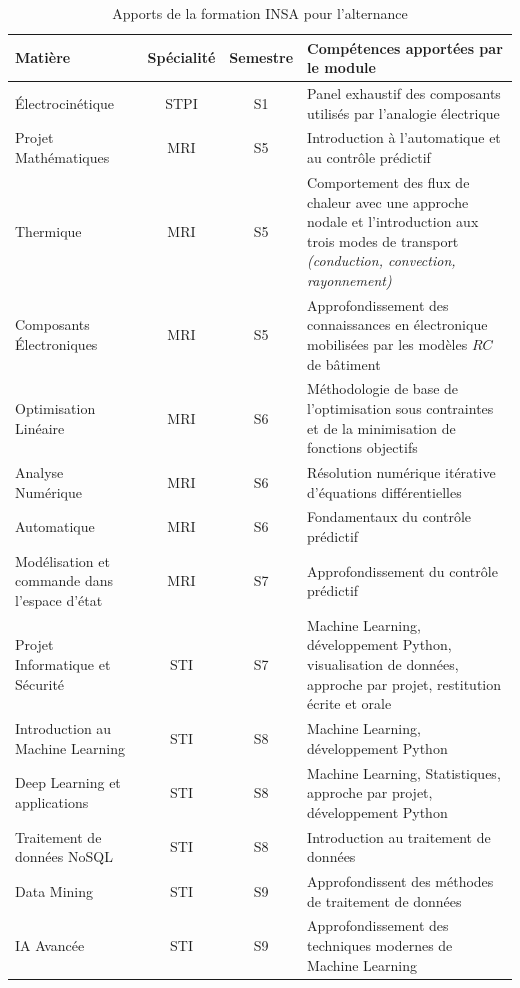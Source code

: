 \begin{table}[H]
    \centering \renewcommand{\arraystretch}{1.3}
    \begin{tabularx}{\textwidth}{lccX}
         \toprule \textbf{Matière} & \textbf{Spécialité} & \textbf{Semestre} & \textbf{Compétences apportées par le module}\\
         \midrule
         Électrocinétique & STPI & S1 & Panel exhaustif des composants utilisés par l'analogie électrique\\
         Projet Mathématiques & \gls{MRI} & S5 & Introduction à l'automatique et au contrôle prédictif \\
         Thermique & \gls{MRI} & S5 & Comportement des flux de chaleur avec une approche nodale et l'introduction aux trois modes de transport \textit{(conduction, convection, rayonnement)}\\
         Composants Électroniques & \gls{MRI} & S5 & Approfondissement des connaissances en électronique mobilisées par les modèles $RC$ de bâtiment\\
         Optimisation Linéaire & \gls{MRI} & S6 & Méthodologie de base de l'optimisation sous contraintes et de la minimisation de fonctions objectifs \\
         Analyse Numérique & \gls{MRI} & S6 & Résolution numérique itérative d'équations différentielles \\
         Automatique & \gls{MRI} & S6 & Fondamentaux du contrôle prédictif \\
         Modélisation et commande dans l'espace d'état & \gls{MRI} & S7 & Approfondissement du contrôle prédictif \\
         Projet Informatique et Sécurité & \gls{STI} & S7 & Machine Learning, développement Python, visualisation de données, approche par projet, restitution écrite et orale \\
         Introduction au Machine Learning & \gls{STI} & S8 & Machine Learning, développement Python \\
         Deep Learning et applications & \gls{STI} & S8 & Machine Learning, Statistiques, approche par projet, développement Python \\
         Traitement de données NoSQL & \gls{STI} & S8 & Introduction au traitement de données \\
         Data Mining & \gls{STI} & S9 & Approfondissent des méthodes de traitement de données \\
         IA Avancée & \gls{STI} & S9 & Approfondissement des techniques modernes de Machine Learning \\
         \bottomrule
     \end{tabularx}
    \caption{Apports de la formation INSA pour l'alternance}
    \label{tab:modules}
\end{table}


